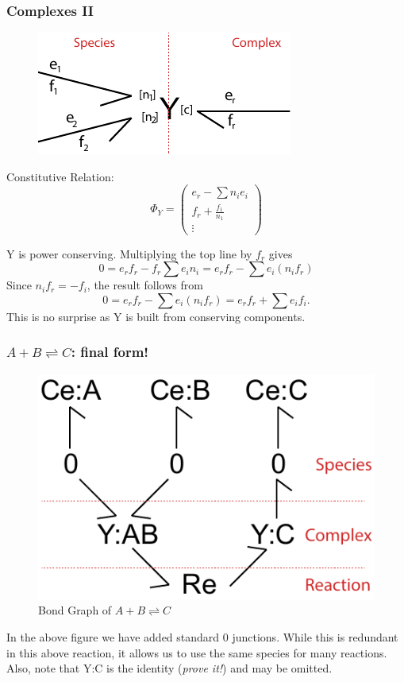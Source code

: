 \documentclass[10pt,reqno]{beamer}
\begin{document}
\begin{frame}
\frametitle{Complexes II}
\begin{minipage}{0.58\textwidth}
\begin{figure}
	\includegraphics{images/stoic_Y}
\end{figure}
\end{minipage}
\begin{minipage}{0.38\textwidth}
Constitutive Relation:
\[
\Phi_{Y} = \left(\begin{matrix}
e_r - \sum n_ie_i \\
f_r + \frac{f_1}{n_1}\\
\vdots
\end{matrix}\right)
\]
\end{minipage}

\vspace{20pt}

$\text{Y}$ is power conserving. Multiplying the top line by $f_r$ gives 
\[
0 = e_r f_r - f_r\sum e_i n_i  =e_r f_r - \sum e_i (n_if_r)
\]
Since $n_if_r = -f_i$, the result follows from
\[
0 = e_r f_r - \sum e_i (n_if_r) = e_rf_r + \sum e_if_i.
\]
This is no surprise as $\text{Y}$ is built from conserving components.

\end{frame}
\begin{frame}
\frametitle{$A+B\rightleftharpoons C$: final form!}
\begin{figure}
	\includegraphics[scale=0.75]{images/bondgraph_abc}
	\caption{Bond Graph of $A+B \rightleftharpoons C$}
\end{figure}
In the above figure we have added standard 0 junctions. While this is redundant in this above reaction, it allows us to use the same species for many reactions.
Also, note that $\text{Y:C}$ is the identity (\emph{prove it!}) and may be omitted.
\end{frame}
\end{document}
